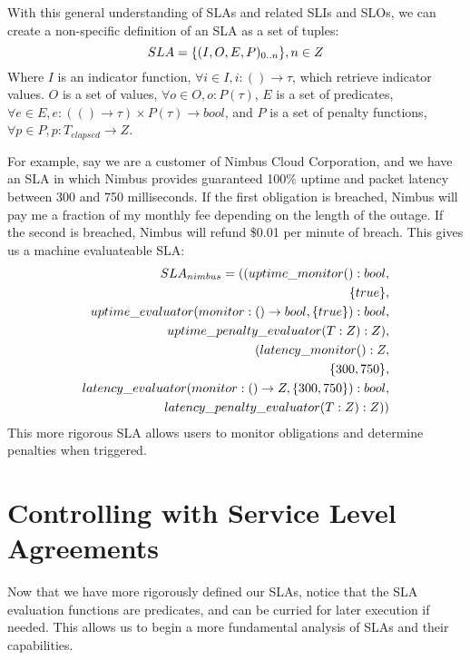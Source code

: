 With this general understanding of SLAs and related SLIs and SLOs, we can create a non-specific definition of an SLA as a set of tuples:
\begin{equation}
SLA = \lbrace (I,O,E,P)_{0..n} \rbrace, n \in Z \\
\end{equation}
Where $ I $ is an indicator function, $ \forall i \in I, i : () \rightarrow \tau $, which retrieve indicator values.  $ O $ is a set of values, $ \forall o \in O, o : P(\tau) $, $ E $ is a set of predicates, $ \forall e \in E, e : ( () \rightarrow \tau ) \times P(\tau) \rightarrow bool $, and $ P $ is a set of penalty functions, $ \forall p \in P, p : T_{elapsed} \rightarrow Z $.

For example, say we are a customer of Nimbus Cloud Corporation, and we have an SLA in which Nimbus provides guaranteed 100\% uptime and packet latency between 300 and 750 milliseconds.  If the first obligation is breached, Nimbus will pay me a fraction of my monthly fee depending on the length of the outage.  If the second is breached, Nimbus will refund \$0.01 per minute of breach.  This gives us a machine evaluateable SLA:
\begin{align}
SLA_{nimbus} = ( ( uptime\_monitor() : bool, \\
\lbrace true \rbrace, \notag \\
uptime\_evaluator( monitor : () \rightarrow bool, \lbrace true \rbrace) : bool, \notag \\
uptime\_penalty\_evaluator( T : Z ) : Z ), \notag \\
( latency\_monitor() : Z, \notag \\
\lbrace 300, 750 \rbrace, \notag \\
latency\_evaluator( monitor : () \rightarrow Z, \lbrace 300, 750 \rbrace) : bool, \notag \\
latency\_penalty\_evaluator( T : Z ) : Z) ) \notag
\end{align}
This more rigorous SLA allows users to monitor obligations and determine penalties when triggered.

\section{Controlling with Service Level Agreements}\label{sec:SLA-analysis}
Now that we have more rigorously defined our SLAs, notice that the SLA evaluation functions are predicates, and can be curried for later execution if needed.  This allows us to begin a more fundamental analysis of SLAs and their capabilities.

